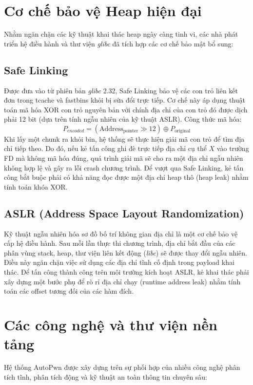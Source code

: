 \documentclass[final]{hcmuitthesis}
\begin{document}
\section{Cơ chế bảo vệ Heap hiện đại}
Nhằm ngăn chặn các kỹ thuật khai thác heap ngày càng tinh vi, các nhà phát triển hệ điều hành và thư viện \textit{glibc} đã tích hợp các cơ chế bảo mật bổ sung:

\subsection{Safe Linking}
Được đưa vào từ phiên bản \textit{glibc} 2.32, Safe Linking bảo vệ các con trỏ liên kết đơn trong tcache và fastbins khỏi bị sửa đổi trực tiếp. Cơ chế này áp dụng thuật toán mã hóa XOR con trỏ nguyên bản với chính địa chỉ của con trỏ đó được dịch phải 12 bit (dựa trên tính ngẫu nhiên của kỹ thuật ASLR).
Công thức mã hóa:
\begin{equation}
    P_{encoded} = \left(\text{Address}_{\text{pointer}} \gg 12\right) \oplus P_{\text{original}}
\end{equation}
Khi lấy một chunk ra khỏi bin, hệ thống sẽ thực hiện giải mã con trỏ để tìm địa chỉ tiếp theo. Do đó, nếu kẻ tấn công ghi đè trực tiếp địa chỉ cụ thể $X$ vào trường FD mà không mã hóa đúng, quá trình giải mã sẽ cho ra một địa chỉ ngẫu nhiên không hợp lệ và gây ra lỗi crash chương trình. Để vượt qua Safe Linking, kẻ tấn công bắt buộc phải có khả năng đọc được một địa chỉ heap thô (heap leak) nhằm tính toán khóa XOR.

\subsection{ASLR (Address Space Layout Randomization)}
Kỹ thuật ngẫu nhiên hóa sơ đồ bố trí không gian địa chỉ là một cơ chế bảo vệ cấp hệ điều hành. Sau mỗi lần thực thi chương trình, địa chỉ bắt đầu của các phân vùng stack, heap, thư viện liên kết động (\textit{libc}) sẽ được thay đổi ngẫu nhiên. Điều này ngăn chặn việc sử dụng các địa chỉ tĩnh cố định trong payload khai thác. Để tấn công thành công trên môi trường kích hoạt ASLR, kẻ khai thác phải xây dựng một bước phụ để rò rỉ địa chỉ chạy (runtime address leak) nhằm tính toán các offset tương đối của các hàm đích.

\section{Các công nghệ và thư viện nền tảng}
Hệ thống AutoPwn được xây dựng trên sự phối hợp của nhiều công nghệ phân tích tĩnh, phân tích động và kỹ thuật an toàn thông tin chuyên sâu:
\end{document}
